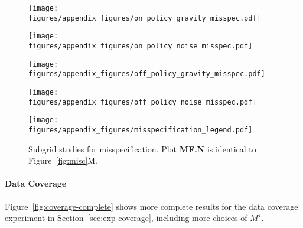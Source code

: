 \begin{figure}[H]
    \centering
    \begin{minipage}{0.25\textwidth}
        \texttt{[image: figures/appendix\_figures/on\_policy\_gravity\_misspec.pdf]}
    \end{minipage}%
    \begin{minipage}{0.25\textwidth}
        \texttt{[image: figures/appendix\_figures/on\_policy\_noise\_misspec.pdf]}
    \end{minipage}%
    \begin{minipage}{0.25\textwidth}
        \texttt{[image: figures/appendix\_figures/off\_policy\_gravity\_misspec.pdf]}
    \end{minipage}%
    \begin{minipage}{0.25\textwidth}
        \texttt{[image: figures/appendix\_figures/off\_policy\_noise\_misspec.pdf]}
    \end{minipage}%
    \begin{minipage}{0.25\textwidth}
    \end{minipage}%
    \vspace{0.01pt}
    \begin{minipage}{\textwidth}
        \texttt{[image: figures/appendix\_figures/misspecification\_legend.pdf]}
    \end{minipage}%
    \caption{Subgrid studies for misspecification. Plot \textbf{MF.N} is identical to Figure~\ref{fig:misc}M.}
    \label{fig:misspec-complete}
\end{figure}



\paragraph{Data Coverage} Figure~\ref{fig:coverage-complete} shows more complete results for the data coverage experiment in Section~\ref{sec:exp-coverage}, including more choices of $M^\star$. 


